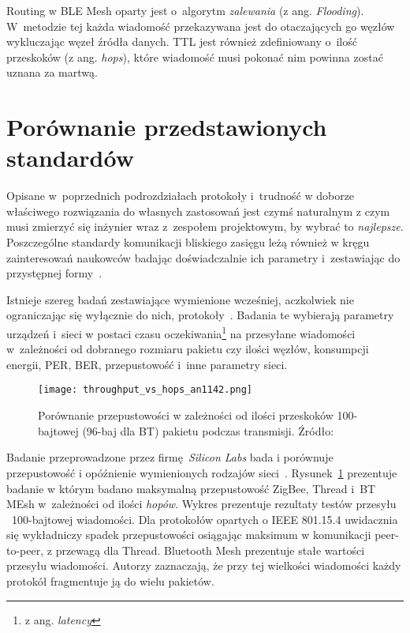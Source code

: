 Routing w BLE Mesh oparty jest o~algorytm \textit{zalewania} (z ang. \textit{Flooding}). W~metodzie tej każda wiadomość przekazywana
jest do otaczających go węzłów wykluczając węzeł źródła danych. \gls{TTL} jest również zdefiniowany o~ilość przeskoków (z ang. \textit{hops}),
które wiadomość musi pokonać nim powinna zostać uznana za martwą.

\section{Porównanie przedstawionych standardów} 
Opisane w~poprzednich podrozdziałach protokoły i~trudność w doborze właściwego rozwiązania
do własnych zastosowań jest czymś naturalnym z czym musi zmierzyć się inżynier wraz z~zespołem
projektowym, by wybrać to \textit{najlepsze}. Poszczególne standardy komunikacji bliskiego
zasięgu leżą również w kręgu zainteresowań naukowców badając doświadczalnie ich parametry
i~zestawiając do przystępnej formy~\cite{lethaby_wireless_2017, ray_edge_2019}.

Istnieje szereg badań zestawiające wymienione wcześniej, aczkolwiek nie ograniczając się wyłącznie
do nich, protokoły~\cite{rzepecki_iotsp_2019,ray_edge_2019,noauthor_an1142_nodate,georgakakis_analysis_2011}.
Badania te wybierają parametry urządzeń i~sieci w postaci czasu oczekiwania\footnote{z ang. \textit{latency}} na przesyłane wiadomości
w~zależności od dobranego rozmiaru pakietu czy ilości węzłów, konsumpcji energii, \gls{PER}, \gls{BER},
przepustowość i~inne parametry sieci.

\begin{figure}[!ht]
	\centering \texttt{[image: throughput\_vs\_hops\_an1142.png]} 
	\caption{Porównanie przepustowości w zależności od ilości przeskoków 100-bajtowej (96-baj dla BT) pakietu podczas transmisji. Źródło: \cite{noauthor_an1142_nodate}}
	\label{rys:throughput_vs_hops_an1142}
\end{figure}

Badanie przeprowadzone przez firmę~\textit{Silicon Labs} bada i porównuje przepustowość i opóźnienie
wymienionych rodzajów sieci~\cite{noauthor_an1142_nodate}. Rysunek~\ref{rys:throughput_vs_hops_an1142}
prezentuje badanie w którym badano maksymalną przepustowość ZigBee, Thread i~BT MEsh 
w~zależności od ilości \textit{hopów}. Wykres prezentuje rezultaty testów przesyłu ~100-bajtowej wiadomości.
Dla protokołów opartych o IEEE 801.15.4 uwidacznia się wykładniczy spadek przepustowości osiągając
maksimum w komunikacji peer-to-peer, z przewagą dla Thread. Bluetooth Mesh prezentuje
stałe wartości przesyłu wiadomości. Autorzy zaznaczają, że przy tej wielkości wiadomości każdy protokół
fragmentuje ją do wielu pakietów.

